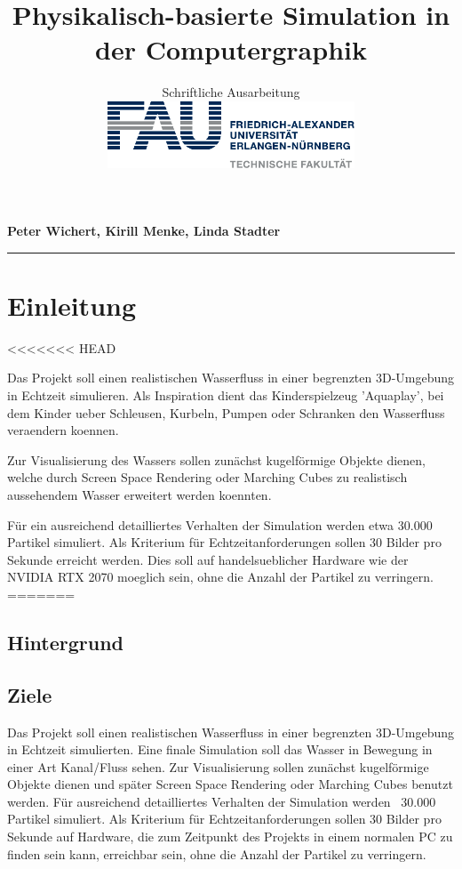 \documentclass[a4paper]{paper}
\title{Physikalisch-basierte Simulation in der Computergraphik}
\subtitle{Schriftliche Ausarbeitung\\
\hfill\includegraphics[height=2cm]{fau-logo-tech.pdf}
\vspace{-2cm}}
\author{\ProjectTitle}
\newcommand{\StudentNames}{Peter Wichert, Kirill Menke, Linda Stadter}
\begin{document}
 
\maketitle 
\textbf{\StudentNames} \\
\hrule\bigskip



\section{Einleitung} 
<<<<<<< HEAD

Das Projekt soll einen realistischen Wasserfluss in einer begrenzten 3D-Umgebung in Echtzeit simulieren. %
Als Inspiration dient das Kinderspielzeug 'Aquaplay', bei dem Kinder ueber Schleusen, Kurbeln, Pumpen oder Schranken den Wasserfluss veraendern koennen. 

Zur Visualisierung des Wassers sollen zunächst kugelförmige Objekte dienen, welche durch Screen Space Rendering oder Marching Cubes zu realistisch aussehendem Wasser erweitert werden koennten. 

Für ein ausreichend detailliertes Verhalten der Simulation werden etwa 30.000 Partikel simuliert. Als Kriterium für Echtzeitanforderungen sollen 30 Bilder pro Sekunde erreicht werden. Dies soll auf handelsueblicher Hardware wie der NVIDIA RTX 2070 moeglich sein, ohne die Anzahl der Partikel zu verringern. 
=======
\subsection{Hintergrund}

\subsection{Ziele}
Das Projekt soll einen realistischen Wasserfluss in einer begrenzten 3D-Umgebung in Echtzeit simulierten. %
Eine finale Simulation soll das Wasser in Bewegung in einer Art Kanal/Fluss sehen.
Zur Visualisierung sollen zunächst kugelförmige Objekte dienen und später Screen Space Rendering oder Marching Cubes benutzt werden. 
Für ausreichend detailliertes Verhalten der Simulation werden ~30.000 Partikel simuliert. Als Kriterium für Echtzeitanforderungen sollen 30 Bilder pro Sekunde auf Hardware, die zum Zeitpunkt des Projekts in einem normalen PC zu finden sein kann, erreichbar sein, ohne die Anzahl der Partikel zu verringern. 
\end{document}
